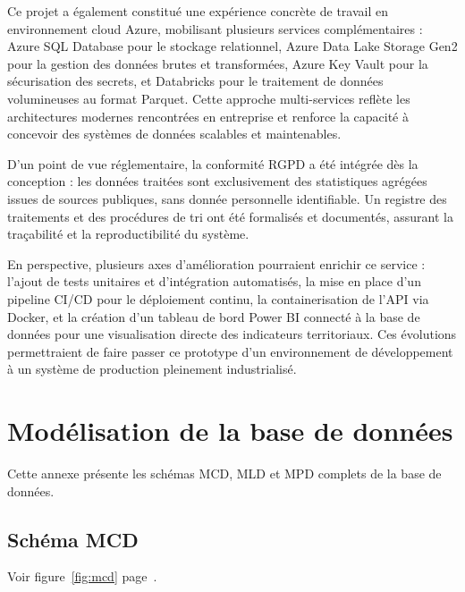 \documentclass[12pt,a4paper]{article}
\begin{document}
Ce projet a également constitué une expérience concrète de travail en environnement cloud Azure, mobilisant plusieurs services complémentaires : Azure SQL Database pour le stockage relationnel, Azure Data Lake Storage Gen2 pour la gestion des données brutes et transformées, Azure Key Vault pour la sécurisation des secrets, et Databricks pour le traitement de données volumineuses au format Parquet. Cette approche multi-services reflète les architectures modernes rencontrées en entreprise et renforce la capacité à concevoir des systèmes de données scalables et maintenables.

D'un point de vue réglementaire, la conformité RGPD a été intégrée dès la conception : les données traitées sont exclusivement des statistiques agrégées issues de sources publiques, sans donnée personnelle identifiable. Un registre des traitements et des procédures de tri ont été formalisés et documentés, assurant la traçabilité et la reproductibilité du système.

En perspective, plusieurs axes d'amélioration pourraient enrichir ce service : l'ajout de tests unitaires et d'intégration automatisés, la mise en place d'un pipeline CI/CD pour le déploiement continu, la containerisation de l'API via Docker, et la création d'un tableau de bord Power BI connecté à la base de données pour une visualisation directe des indicateurs territoriaux. Ces évolutions permettraient de faire passer ce prototype d'un environnement de développement à un système de production pleinement industrialisé.

\newpage
\appendix
\renewcommand{\thesection}{\Alph{section}}

\section{Modélisation de la base de données}

Cette annexe présente les schémas MCD, MLD et MPD complets de la base de données.

\subsection{Schéma MCD}

Voir figure~\ref{fig:mcd} page~\pageref{fig:mcd}.
\end{document}
